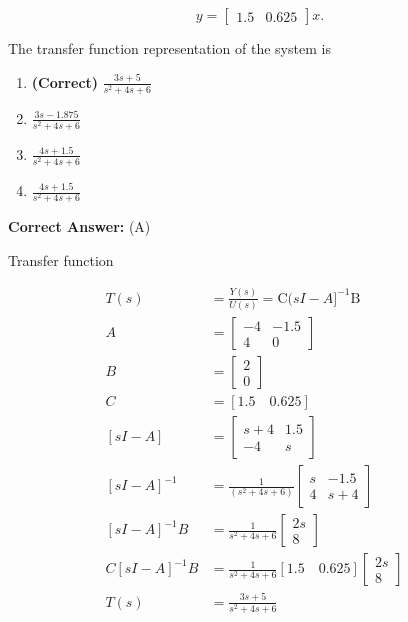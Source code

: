 \documentclass[11pt,a4paper]{article}
\begin{document}
 
\[
y=\begin{bmatrix} 1.5 & 0.625 \end{bmatrix}x.
\]
  

The transfer function representation of the system is


\begin{enumerate}[label=(\Alph*)]
    \item \textbf{(Correct)} $\frac{3s+5}{s^{2}+4s+6}$
    \item $\frac{3s-1.875}{s^{2}+4s+6}$
    \item $\frac{4s+1.5}{s^{2}+4s+6}$
    \item $\frac{4s+1.5}{s^{2}+4s+6}$
\end{enumerate}

\noindent \textbf{Correct Answer:} (A)

\begin{tcolorbox}[solbox, title=Detailed Solution -- Question 42]
Transfer function

\[
\begin{aligned} T(s) &=\frac{Y(s)}{U(s)}=\mathrm{C}(s I-A]^{-1} \mathrm{B} \\ A &=\left[\begin{array}{cc} -4 & -1.5 \\ 4 & 0 \end{array}\right] \\ B &=\left[\begin{array}{c} 2 \\ 0 \end{array}\right] \\ C&=[1.5\quad0.625]\\ {[s I-A]} & =\left[\begin{array}{cc}s+4 & 1.5 \\-4 & s\end{array}\right] \\ {[s I-A]^{-1}} & =\frac{1}{\left(s^{2}+4 s+6\right)}\left[\begin{array}{cc}s & -1.5 \\4 & s+4 \end{array}\right] \\ {[s I-A]^{-1} B} & =\frac{1}{s^{2}+4 s+6}\left[\begin{array}{c}2 s \\8 \end{array}\right] & \\ C[s I-A]^{-1} B & =\frac{1}{s^{2}+4 s+6}[1.5 \quad 0.625]\left[\begin{array}{c}2 s \\ 8\end{array}\right] \\ T(s) & =\frac{3 s+5}{s^{2}+4 s+6} \end{aligned}
\]
\end{tcolorbox}
\end{document}
